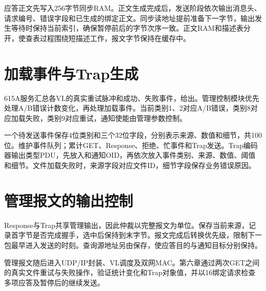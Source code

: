 应答正文先写入256字节同步RAM。正文生成完成后，发送阶段依次输出消息头、请求编号、错误字段和已生成的绑定正文。同步读地址提前准备下一字节，输出发生等待时保持当前索引，确保暂停前后的字节次序一致。正文RAM和描述表分开，使查表过程围绕短描述工作，报文字节保持在缓存中。

\section{加载事件与Trap生成}
615A服务汇总各VL的真实重试脉冲和成功、失败事件，给出。管理控制模块优先处理A/B错误计数变化，再处理加载事件。当前类别1、2对应A/B错误，类别8对应加载失败，类别9对应重试，通知使能由管理参数控制。

一个待发送事件保存4位类别和三个32位字段，分别表示来源、数值和细节，共100位。维护事件队列；累计GET、Response、拒绝、忙事件和Trap发送。Trap编码器输出类型PDU，先放入和通知OID，再依次放入事件类别、来源、数值、阈值和细节。文件加载失败时，来源字段对应文件ID，细节字段保存业务错误原因。

\section{管理报文的输出控制}
Response与Trap共享管理输出，因此仲裁以完整报文为单位。保存当前来源，记录首字节是否完成握手，选中后保持到末字节。报文完成后转换优先级，限制下一包最早进入发送的时刻。查询源地址另由保存，使应答目的与通知目标分别保持。

管理报文随后进入UDP/IP封装、VL调度及双网MAC。第六章通过两次GET之间的真实文件重试与失败操作，验证统计变化和Trap对象值，并以16绑定请求检查多项应答及暂停后的继续发送。
